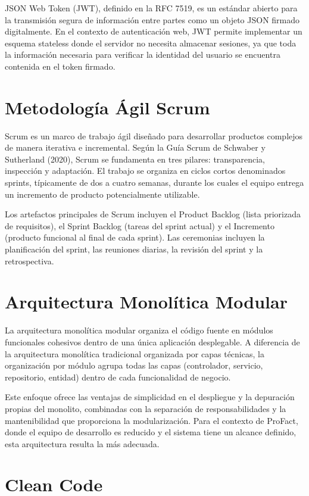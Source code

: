\documentclass[12pt, letterpaper]{report}
\begin{document}
JSON Web Token (JWT), definido en la RFC 7519, es un estándar abierto para la transmisión segura de información entre partes como un objeto JSON firmado digitalmente. En el contexto de autenticación web, JWT permite implementar un esquema stateless donde el servidor no necesita almacenar sesiones, ya que toda la información necesaria para verificar la identidad del usuario se encuentra contenida en el token firmado.

\section{Metodología Ágil Scrum}

Scrum es un marco de trabajo ágil diseñado para desarrollar productos complejos de manera iterativa e incremental. Según la Guía Scrum de Schwaber y Sutherland (2020), Scrum se fundamenta en tres pilares: transparencia, inspección y adaptación. El trabajo se organiza en ciclos cortos denominados sprints, típicamente de dos a cuatro semanas, durante los cuales el equipo entrega un incremento de producto potencialmente utilizable.

Los artefactos principales de Scrum incluyen el Product Backlog (lista priorizada de requisitos), el Sprint Backlog (tareas del sprint actual) y el Incremento (producto funcional al final de cada sprint). Las ceremonias incluyen la planificación del sprint, las reuniones diarias, la revisión del sprint y la retrospectiva.

\section{Arquitectura Monolítica Modular}

La arquitectura monolítica modular organiza el código fuente en módulos funcionales cohesivos dentro de una única aplicación desplegable. A diferencia de la arquitectura monolítica tradicional organizada por capas técnicas, la organización por módulo agrupa todas las capas (controlador, servicio, repositorio, entidad) dentro de cada funcionalidad de negocio.

Este enfoque ofrece las ventajas de simplicidad en el despliegue y la depuración propias del monolito, combinadas con la separación de responsabilidades y la mantenibilidad que proporciona la modularización. Para el contexto de ProFact, donde el equipo de desarrollo es reducido y el sistema tiene un alcance definido, esta arquitectura resulta la más adecuada.

\section{Clean Code}
\end{document}
